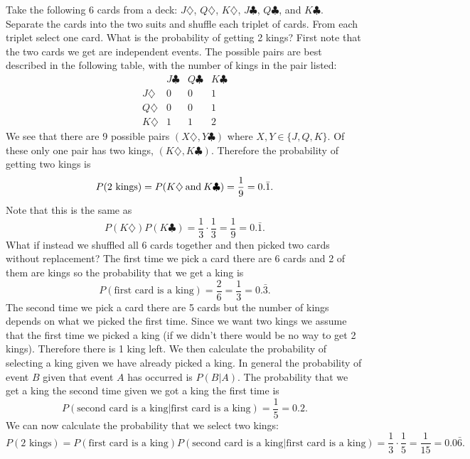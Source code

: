     Take the following 6 cards from a deck: \(J\diamondsuit\), \(Q\diamondsuit\), \(K\diamondsuit\), \(J\clubsuit\), \(Q\clubsuit\), and \(K\clubsuit\).
    Separate the cards into the two suits and shuffle each triplet of cards.
    From each triplet select one card.
    What is the probability of getting 2 kings?
    First note that the two cards we get are independent events.
    The possible pairs are best described in the following table, with the number of kings in the pair listed:
    \[
        \begin{array}{c|ccc}
            & J\clubsuit & Q\clubsuit & K\clubsuit\\\hline
            J\diamondsuit & 0 & 0 & 1\\
            Q\diamondsuit & 0 & 0 & 1\\
            K\diamondsuit & 1 & 1 & 2
        \end{array}
    \]
    We see that there are 9 possible pairs \((X\diamondsuit, Y\clubsuit)\) where \(X, Y\in \{J, Q, K\}\).
    Of these only one pair has two kings, \((K\diamondsuit, K\clubsuit)\).
    Therefore the probability of getting two kings is
    \[P(\text{2 kings}) = P(K\diamondsuit \mathbin{\operatorname{and}} K\clubsuit) = \frac{1}{9} = 0.\bar{1}.\]
    Note that this is the same as
    \[P(K\diamondsuit)P(K\clubsuit) = \frac{1}{3}\cdot\frac{1}{3} = \frac{1}{9} = 0.\bar{1}.\]
    What if instead we shuffled all 6 cards together and then picked two cards without replacement?
    The first time we pick a card there are 6 cards and 2 of them are kings so the probability that we get a king is
    \[P(\text{first card is a king}) = \frac{2}{6} = \frac{1}{3} = 0.\bar{3}.\]
    The second time we pick a card there are 5 cards but the number of kings depends on what we picked the first time.
    Since we want two kings we assume that the first time we picked a king (if we didn't there would be no way to get 2 kings).
    Therefore there is 1 king left.
    We then calculate the probability of selecting a king given we have already picked a king.
    In general the probability of event \(B\) given that event \(A\) has occurred is \(P(B|A)\).
    The probability that we get a king the second time given we got a king the first time is
    \[P(\text{second card is a king}|\text{first card is a king}) = \frac{1}{5} = 0.2.\]
    We can now calculate the probability that we select two kings:
    \[P(\text{2 kings}) = P(\text{first card is a king})P(\text{second card is a king}|\text{first card is a king}) = \frac{1}{3}\cdot\frac{1}{5} = \frac{1}{15} = 0.0\bar{6}.\]
    
